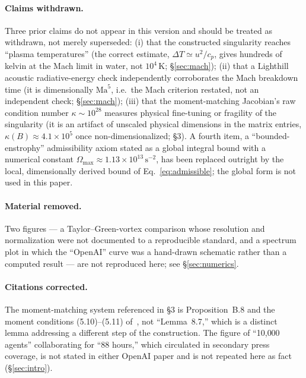 \documentclass[11pt,a4paper]{article}
\begin{document}
\paragraph{Claims withdrawn.} Three prior claims do not appear in this version and should be
treated as withdrawn, not merely superseded: (i) that the constructed singularity reaches ``plasma
temperatures'' (the correct estimate, $\Delta T\simeq u^2/c_p$, gives hundreds of kelvin at the Mach
limit in water, not $10^4$\,K; \S\ref{sec:mach}); (ii) that a Lighthill acoustic radiative-energy
check independently corroborates the Mach breakdown time (it is dimensionally $\mathrm{Ma}^5$, i.e.\
the Mach criterion restated, not an independent check; \S\ref{sec:mach}); (iii) that the
moment-matching Jacobian's raw condition number $\kappa\sim10^{28}$ measures physical fine-tuning or
fragility of the singularity (it is an artifact of unscaled physical dimensions in the matrix
entries, $\kappa(B)\approx4.1\times10^5$ once non-dimensionalized; \S3). A fourth item, a
``bounded-enstrophy'' admissibility axiom stated as a global integral bound with a numerical
constant $\Omega_{\max}\approx1.13\times10^{13}\,\text{s}^{-2}$, has been replaced outright by the
local, dimensionally derived bound of Eq.~\eqref{eq:admissible}; the global form is not used in this
paper.

\paragraph{Material removed.} Two figures --- a Taylor--Green-vortex comparison whose resolution
and normalization were not documented to a reproducible standard, and a spectrum plot in which the
``OpenAI'' curve was a hand-drawn schematic rather than a computed result --- are not reproduced
here; see \S\ref{sec:numerics}.

\paragraph{Citations corrected.} The moment-matching system referenced in \S3 is
Proposition~B.8 and the moment conditions (5.10)--(5.11) of~\cite{OpenAI2026}, not ``Lemma~8.7,''
which is a distinct lemma addressing a different step of the construction. The figure of
``10{,}000 agents'' collaborating for ``88 hours,'' which circulated in secondary press coverage, is
not stated in either OpenAI paper and is not repeated here as fact (\S\ref{sec:intro}).
\end{document}

